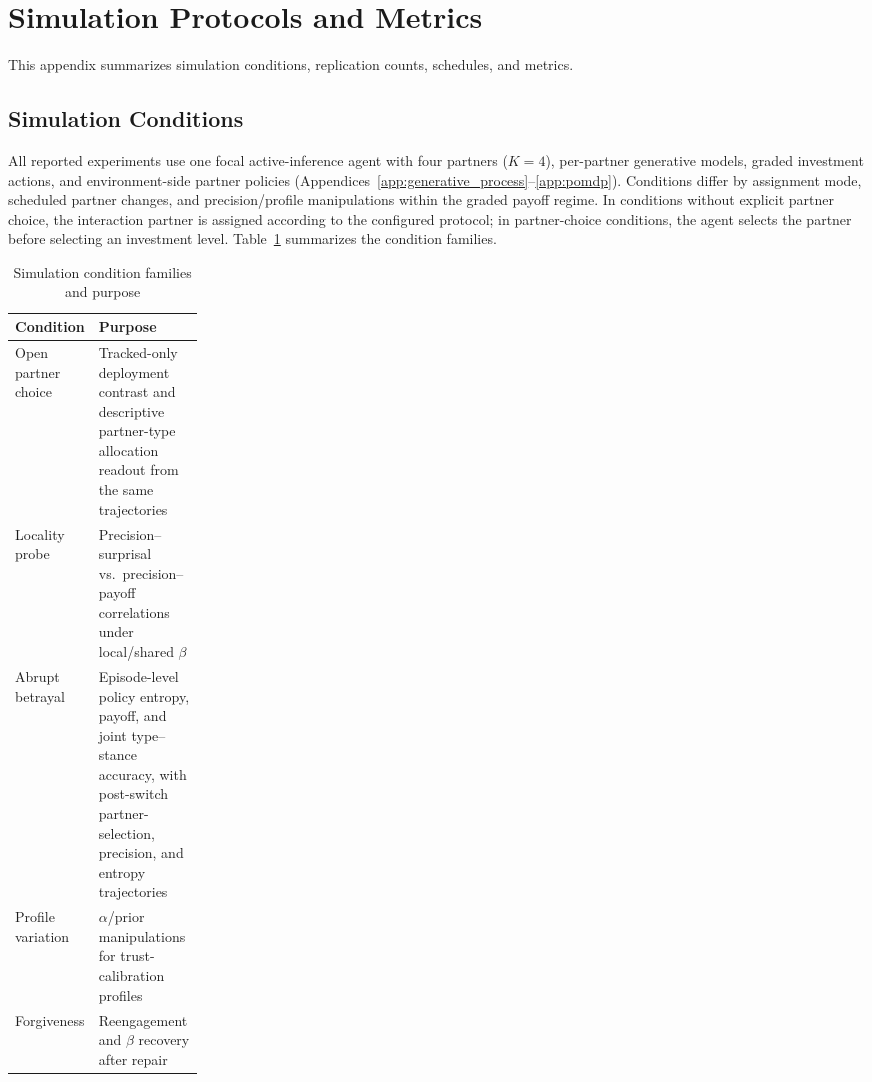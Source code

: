 \documentclass[runningheads,orivec]{llncs}
\begin{document}
\section{Simulation Protocols and Metrics}
\label{app:protocols}

This appendix summarizes simulation conditions, replication counts, schedules, and metrics.

\subsection{Simulation Conditions}

All reported experiments use one focal active-inference agent with four partners (\(K=4\)), per-partner generative models, graded investment actions, and environment-side partner policies (Appendices~\ref{app:generative_process}--\ref{app:pomdp}). Conditions differ by assignment mode, scheduled partner changes, and precision/profile manipulations within the graded payoff regime. In conditions without explicit partner choice, the interaction partner is assigned according to the configured protocol; in partner-choice conditions, the agent selects the partner before selecting an investment level. Table~\ref{tab:simulation_conditions} summarizes the condition families.

\begin{table}[H]
\centering
\small
\caption{Simulation condition families and purpose}
\label{tab:simulation_conditions}
\begin{tabularx}{\linewidth}{@{}>{\raggedright\arraybackslash}p{0.22\linewidth}X@{}}
\toprule
Condition & Purpose \\
\midrule
Open partner choice & Tracked-only deployment contrast and descriptive partner-type allocation readout from the same trajectories \\
Locality probe & Precision--surprisal vs.\ precision--payoff correlations under local/shared $\beta$ \\
Abrupt betrayal & Episode-level policy entropy, payoff, and joint type--stance accuracy, with post-switch partner-selection, precision, and entropy trajectories \\
Profile variation & $\alpha$/prior manipulations for trust-calibration profiles \\
Forgiveness & Reengagement and $\beta$ recovery after repair \\
\bottomrule
\end{tabularx}
\end{table}
\end{document}
